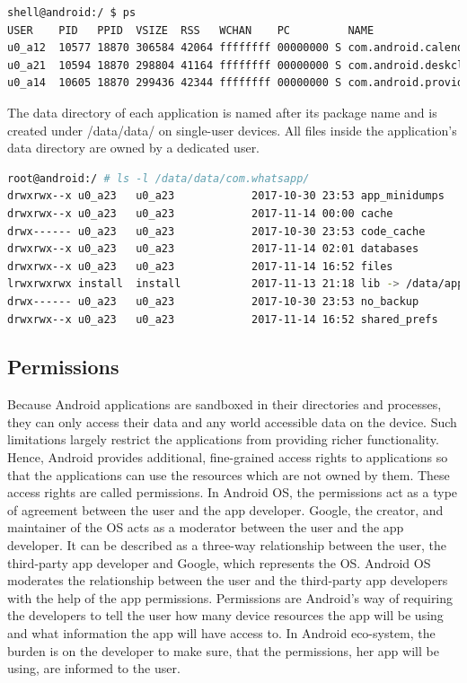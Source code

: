 \begin{lstlisting}[language=bash,basicstyle=\tiny,caption={Each application process executes as a dedicated user on Android}, captionpos=b, label=listing:sparql_getallindividuals,
   basicstyle=\tiny]
shell@android:/ $ ps
USER    PID   PPID  VSIZE  RSS   WCHAN    PC         NAME
u0_a12  10577 18870 306584 42064 ffffffff 00000000 S com.android.calendar
u0_a21  10594 18870 298804 41164 ffffffff 00000000 S com.android.deskclock
u0_a14  10605 18870 299436 42344 ffffffff 00000000 S com.android.providers.calendar
\end{lstlisting}

The data directory of each application is named after its package name and is created under /data/data/ on single-user devices. All files inside the application's data directory are owned by a dedicated user.
\begin{lstlisting}[language=bash,caption={Application directories are owned by dedicated Linux user}, captionpos=b, label=listing:sparql_getallindividuals, basicstyle=\tiny]
root@android:/ # ls -l /data/data/com.whatsapp/                                
drwxrwx--x u0_a23   u0_a23            2017-10-30 23:53 app_minidumps
drwxrwx--x u0_a23   u0_a23            2017-11-14 00:00 cache
drwx------ u0_a23   u0_a23            2017-10-30 23:53 code_cache
drwxrwx--x u0_a23   u0_a23            2017-11-14 02:01 databases
drwxrwx--x u0_a23   u0_a23            2017-11-14 16:52 files
lrwxrwxrwx install  install           2017-11-13 21:18 lib -> /data/app-lib/com.whatsapp-1
drwx------ u0_a23   u0_a23            2017-10-30 23:53 no_backup
drwxrwx--x u0_a23   u0_a23            2017-11-14 16:52 shared_prefs


\end{lstlisting}

\subsection{Permissions}
Because Android applications are sandboxed in their directories and processes, they can only access their data and any world accessible data on the device. Such limitations largely restrict the applications from providing richer functionality. Hence, Android provides additional, fine-grained access rights to applications so that the applications can use the resources which are not owned by them. These access rights are called permissions. In Android OS, the permissions act as a type of agreement between the user and the app developer. Google, the creator, and maintainer of the OS acts as a moderator between the user and the app developer. It can be described as a three-way relationship between the user, the third-party app developer and Google, which represents the OS. Android OS moderates the relationship between the user and the third-party app developers with the help of the app permissions. Permissions are Android's way of requiring the developers to tell the user how many device resources the app will be using and what information the app will have access to. In Android eco-system, the burden is on the developer to make sure, that the permissions, her app will be using, are informed to the user.


